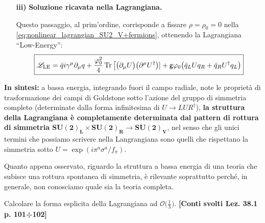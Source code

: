\documentclass[../main.tex]{subfiles}
\begin{document}
\begin{enumerate}
    \item[\textbf{iii)}] \textbf{Soluzione ricavata nella Lagrangiana.}

    Questo passaggio, al prim'ordine, corrisponde a fissare $\rho = \rho_0 = 0$ nella \ref{eq:nonlinear_lagrangian_SU2_V+fermions}, ottenendo la Lagrangiana “Low-Energy”:
    \begin{equation}
        \boxed{\mathscr{L}_\text{LE} = \bar q i\gamma^\mu\partial_\mu q + \frac{\varphi_0^2}{4}\Tr\big[\big(\partial_\mu U\big)\big(\partial^\mu U^\dagger\big)] + \mathsf{g}\varphi_0\big(\bar q_L U q_R + \bar q_R U^\dagger q_L\big)}
        \label{eq:leadingorder_lagrangian_rho_intout}
    \end{equation}
\end{enumerate}

\textbf{In sintesi:} a bassa energia, integrando fuori il campo radiale, note le proprietà di trasformazione dei campi di Goldstone sotto l'azione del gruppo di simmetria completo (determinate dalla forma infinitesima di $U\rightarrow LUR^\dagger$), \textbf{la struttura della Lagrangiana è completamente determinata dal pattern di rottura di simmetria SU$\mathbf{(2)_L\times}$SU$\mathbf{(2)_R\rightarrow}$SU$\mathbf{(2)_V}$}, nel senso che gli unici termini che possiamo scrivere nella Langrangiana sono quelli che rispettano la simmetria sotto $U = \exp(i\pi^a\sigma^a/f_\pi)$.

\begin{nota}
    Quanto appena osservato, riguardo la struttura a bassa energia di una teoria che subisce una rottura spontanea di simmetria, è rilevante soprattutto perché, in generale, non conosciamo quale sia la teoria completa.
\end{nota}
\begin{exercise}
    Calcolare la forma esplicita della Lagrangiana ad $\mathscr O\big(\frac{1}{\lambda}\big)$. \textbf{[Conti svolti Lez. 38.1 p. 101÷102]}
\end{exercise}
\end{document}
